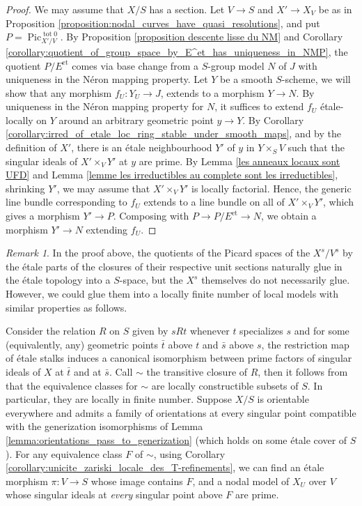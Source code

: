 \documentclass[a4paper,10pt,twoside]{article}
\newcommand{\on}[1]{\operatorname{#1}}
\DeclareMathOperator{\pic}{Pic}
\theoremstyle{definition}
\theoremstyle{remark}
\newtheorem{rem}{Remark}[thm]
\renewcommand{\on}[1]{\operatorname{#1}}
\begin{document}
\begin{proof}
We may assume that $X/S$ has a section. Let $V \to S$ and $X' \to X_V$ be as in Proposition \ref{proposition:nodal_curves_have_quasi_resolutions}, and put $P=\pic^{\on{tot}0}_{X'/V}$. By Proposition \ref{proposition descente lisse du NM} and Corollary \ref{corollary:quotient_of_group_space_by_E^et_has_uniqueness_in_NMP}, the quotient $P/E^{\on{et}}$ comes via base change from a $S$-group model $N$ of $J$ with uniqueness in the Néron mapping property. Let $Y$ be a smooth $S$-scheme, we will show that any morphism $f_U\colon Y_U \to J$, extends to a morphism $Y \to N$. By uniqueness in the Néron mapping property for $N$, it suffices to extend $f_U$ étale-locally on $Y$ around an arbitrary geometric point $y \to Y$. By Corollary \ref{corollary:irred_of_etale_loc_ring_stable_under_smooth_maps}, and by the definition of $X'$, there is an étale neighbourhood $Y'$ of $y$ in $Y\times_S V$ such that the singular ideals of $X'\times_V Y'$ at $y$ are prime. By Lemma \ref{les anneaux locaux sont UFD} and Lemma \ref{lemme les irreductibles au complete sont les irreductibles}, shrinking $Y'$, we may assume that $X'\times_V Y'$ is locally factorial. Hence, the generic line bundle corresponding to $f_U$ extends to a line bundle on all of $X'\times_V Y'$, which gives a morphism $Y' \to P$. Composing with $P \to P/E^{\on{et}} \to N$, we obtain a morphism $Y' \to N$ extending $f_U$.
\end{proof}

\begin{rem}\label{remark:can_glue_local_models_of_curves_on_each_stratum}
In the proof above, the quotients of the Picard spaces of the $X^s/V^s$ by the étale parts of the closures of their respective unit sections naturally glue in the étale topology into a $S$-space, but the $X^s$ themselves do not necessarily glue. However, we could glue them into a locally finite number of local models with similar properties as follows.

Consider the relation $R$ on $S$ given by $sRt$ whenever $t$ specializes $s$ and for some (equivalently, any) geometric points $\bar t$ above $t$ and $\bar s$ above $s$, the restriction map of étale stalks induces a canonical isomorphism between prime factors of singular ideals of $X$ at $\bar t$ and at $\bar s$. Call $\sim$ the transitive closure of $R$, then it follows from \cite[Corollaire 9.7.10]{EGA4.3} that the equivalence classes for $\sim$ are locally constructible subsets of $S$. In particular, they are locally in finite number. Suppose $X/S$ is orientable everywhere and admits a family of orientations at every singular point compatible with the generization isomorphisms of Lemma \ref{lemma:orientations_pass_to_generization} (which holds on some étale cover of $S$). For any equivalence class $F$ of $\sim$, using Corollary \ref{corollary:unicite_zariski_locale_des_T-refinements}, we can find an étale morphism $\pi\colon V \to S$ whose image contains $F$, and a nodal model of $X_U$ over $V$ whose singular ideals at \emph{every} singular point above $F$ are prime.
\end{rem}
\end{document}

